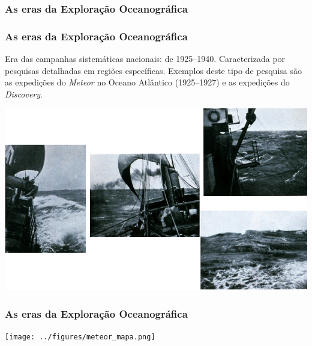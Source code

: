\begin{frame}
    \frametitle{As eras da Exploração Oceanográfica}
    \centerline{}
\end{frame}

\begin{frame}
    \frametitle{As eras da Exploração Oceanográfica}
    \small{Era das campanhas sistemáticas nacionais: de 1925--1940.
    Caracterizada por pesquisas detalhadas em regiões específicas.  Exemplos
    deste tipo de pesquisa são as expedições do {\it Meteor} no Oceano Atlântico
    (1925--1927) e as expedições do {\it Discovery}.}
    \centerline{\includegraphics[scale=0.2]{./figures/meteor.png}}
\end{frame}

\begin{frame}
    \frametitle{As eras da Exploração Oceanográfica}
    \centerline{\texttt{[image: ../figures/meteor\_mapa.png]}}
\end{frame}

